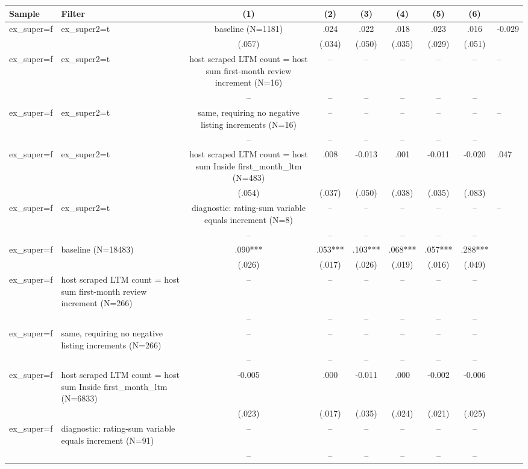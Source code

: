 \begin{tabular}{llcccccc}
\hline
Sample & Filter & (1) & (2) & (3) & (4) & (5) & (6) \\
\hline
ex_super=f & ex_super2=t & baseline (N=1181) & .024 & .022 & .018 & .023 & .016 & -0.029
\\
 &  & (.057) & (.034) & (.050) & (.035) & (.029) & (.051)
\\
ex_super=f & ex_super2=t & host scraped LTM count = host sum first-month review increment (N=16) & -- & -- & -- & -- & -- & --
\\
 &  & -- & -- & -- & -- & -- & --
\\
ex_super=f & ex_super2=t & same, requiring no negative listing increments (N=16) & -- & -- & -- & -- & -- & --
\\
 &  & -- & -- & -- & -- & -- & --
\\
ex_super=f & ex_super2=t & host scraped LTM count = host sum Inside first_month_ltm (N=483) & .008 & -0.013 & .001 & -0.011 & -0.020 & .047
\\
 &  & (.054) & (.037) & (.050) & (.038) & (.035) & (.083)
\\
ex_super=f & ex_super2=t & diagnostic: rating-sum variable equals increment (N=8) & -- & -- & -- & -- & -- & --
\\
 &  & -- & -- & -- & -- & -- & --
\\
ex_super=f & baseline (N=18483) & .090*** & .053*** & .103*** & .068*** & .057*** & .288***
\\
 &  & (.026) & (.017) & (.026) & (.019) & (.016) & (.049)
\\
ex_super=f & host scraped LTM count = host sum first-month review increment (N=266) & -- & -- & -- & -- & -- & --
\\
 &  & -- & -- & -- & -- & -- & --
\\
ex_super=f & same, requiring no negative listing increments (N=266) & -- & -- & -- & -- & -- & --
\\
 &  & -- & -- & -- & -- & -- & --
\\
ex_super=f & host scraped LTM count = host sum Inside first_month_ltm (N=6833) & -0.005 & .000 & -0.011 & .000 & -0.002 & -0.006
\\
 &  & (.023) & (.017) & (.035) & (.024) & (.021) & (.025)
\\
ex_super=f & diagnostic: rating-sum variable equals increment (N=91) & -- & -- & -- & -- & -- & --
\\
 &  & -- & -- & -- & -- & -- & --
\\
\hline
\end{tabular}
